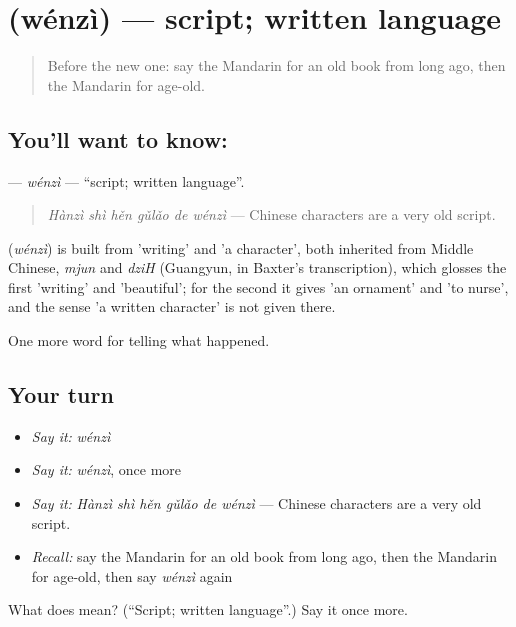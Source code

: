 \section[\texorpdfstring{\zh{文字} (wénzì)}{文字 (wénzì)}]{ (wénzì) — script; written language}

\label{lesson:ZH-C321-wenzi}



\begin{quote}
Before the new one: say the Mandarin for an old book from long ago, then the Mandarin for age-old.
\end{quote}

\subsection*{You'll want to know: }
\textbf{} — \emph{wénzì} — \textquotedblleft{}script; written language\textquotedblright{}.

\begin{quote}
\textbf{} \emph{Hànzì shì hěn gǔlǎo de wénzì} — Chinese characters are a very old script.
\end{quote}

\begin{cousinweb}
\textbf{} (\emph{wénzì}) is built from  'writing' and  'a character', both inherited from Middle Chinese, \emph{mjun} and \emph{dziH} (Guangyun, in Baxter's transcription), which glosses the first 'writing' and 'beautiful'; for the second it gives 'an ornament' and 'to nurse', and the sense 'a written character' is not given there.
\end{cousinweb}

\begin{grammarlens}[title={What you've built}]
One more word for telling what happened.
\end{grammarlens}

\subsection*{Your turn}
\begin{itemize}
\raggedright
  \item \emph{Say it:} \emph{wénzì}
  \item \emph{Say it:} \emph{wénzì}, once more
  \item \emph{Say it:} \emph{Hànzì shì hěn gǔlǎo de wénzì} — Chinese characters are a very old script.
  \item \emph{Recall:} say the Mandarin for an old book from long ago, then the Mandarin for age-old, then say \emph{wénzì} again
\end{itemize}

\begin{tcolorbox}[breakable,colback=teal!4,colframe=teal!35!black,title={Before you move on}]
What does  mean? (\textquotedblleft{}Script; written language\textquotedblright{}.) Say it once more.
\end{tcolorbox}
